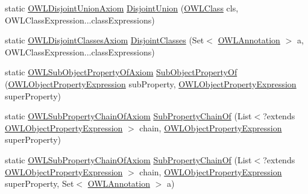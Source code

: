 \begin{DoxyCompactItemize}
\item 
static \hyperlink{interfaceorg_1_1semanticweb_1_1owlapi_1_1model_1_1_o_w_l_disjoint_union_axiom}{O\-W\-L\-Disjoint\-Union\-Axiom} \hyperlink{classorg_1_1semanticweb_1_1owlapi_1_1apibinding_1_1_o_w_l_functional_syntax_factory_a0a2857c629cdbd73ab89cc088a13768a}{Disjoint\-Union} (\hyperlink{interfaceorg_1_1semanticweb_1_1owlapi_1_1model_1_1_o_w_l_class}{O\-W\-L\-Class} cls, O\-W\-L\-Class\-Expression...\-class\-Expressions)
\item 
static \hyperlink{interfaceorg_1_1semanticweb_1_1owlapi_1_1model_1_1_o_w_l_disjoint_classes_axiom}{O\-W\-L\-Disjoint\-Classes\-Axiom} \hyperlink{classorg_1_1semanticweb_1_1owlapi_1_1apibinding_1_1_o_w_l_functional_syntax_factory_ae209b1b137d48b166da1fbd3acc61c11}{Disjoint\-Classes} (Set$<$ \hyperlink{interfaceorg_1_1semanticweb_1_1owlapi_1_1model_1_1_o_w_l_annotation}{O\-W\-L\-Annotation} $>$ a, O\-W\-L\-Class\-Expression...\-class\-Expressions)
\item 
static \hyperlink{interfaceorg_1_1semanticweb_1_1owlapi_1_1model_1_1_o_w_l_sub_object_property_of_axiom}{O\-W\-L\-Sub\-Object\-Property\-Of\-Axiom} \hyperlink{classorg_1_1semanticweb_1_1owlapi_1_1apibinding_1_1_o_w_l_functional_syntax_factory_a2851b4daba55f489de534a233c945e25}{Sub\-Object\-Property\-Of} (\hyperlink{interfaceorg_1_1semanticweb_1_1owlapi_1_1model_1_1_o_w_l_object_property_expression}{O\-W\-L\-Object\-Property\-Expression} sub\-Property, \hyperlink{interfaceorg_1_1semanticweb_1_1owlapi_1_1model_1_1_o_w_l_object_property_expression}{O\-W\-L\-Object\-Property\-Expression} super\-Property)
\item 
static \hyperlink{interfaceorg_1_1semanticweb_1_1owlapi_1_1model_1_1_o_w_l_sub_property_chain_of_axiom}{O\-W\-L\-Sub\-Property\-Chain\-Of\-Axiom} \hyperlink{classorg_1_1semanticweb_1_1owlapi_1_1apibinding_1_1_o_w_l_functional_syntax_factory_a62c3ed89623652ac5d0de5b67c1a08a9}{Sub\-Property\-Chain\-Of} (List$<$?extends \hyperlink{interfaceorg_1_1semanticweb_1_1owlapi_1_1model_1_1_o_w_l_object_property_expression}{O\-W\-L\-Object\-Property\-Expression} $>$ chain, \hyperlink{interfaceorg_1_1semanticweb_1_1owlapi_1_1model_1_1_o_w_l_object_property_expression}{O\-W\-L\-Object\-Property\-Expression} super\-Property)
\item 
static \hyperlink{interfaceorg_1_1semanticweb_1_1owlapi_1_1model_1_1_o_w_l_sub_property_chain_of_axiom}{O\-W\-L\-Sub\-Property\-Chain\-Of\-Axiom} \hyperlink{classorg_1_1semanticweb_1_1owlapi_1_1apibinding_1_1_o_w_l_functional_syntax_factory_a5e76baea139238a8fc4aba669672f5c6}{Sub\-Property\-Chain\-Of} (List$<$?extends \hyperlink{interfaceorg_1_1semanticweb_1_1owlapi_1_1model_1_1_o_w_l_object_property_expression}{O\-W\-L\-Object\-Property\-Expression} $>$ chain, \hyperlink{interfaceorg_1_1semanticweb_1_1owlapi_1_1model_1_1_o_w_l_object_property_expression}{O\-W\-L\-Object\-Property\-Expression} super\-Property, Set$<$ \hyperlink{interfaceorg_1_1semanticweb_1_1owlapi_1_1model_1_1_o_w_l_annotation}{O\-W\-L\-Annotation} $>$ a)

\end{DoxyCompactItemize}
